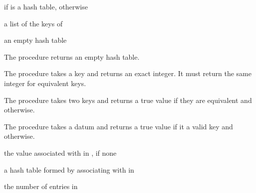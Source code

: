 \begin{procedure}
\end{procedure}
\returns{}  if  is a hash table, 
otherwise

\begin{procedure}
\end{procedure}
\returns{} a list of the keys of 

\begin{procedure}
\end{procedure}
\returns{} an empty hash table

The  procedure returns an empty hash table.

The  procedure takes a key and returns an exact
integer. It must return the same integer for equivalent keys.

The  procedure takes two keys and returns a true value
if they are equivalent and  otherwise.

The  procedure takes a datum and returns a true value
if it a valid key and  otherwise.

\begin{procedure}
\end{procedure}
\returns{} the value associated with  in ,
 if none

\begin{procedure}
\end{procedure}
\returns{} a hash table formed by associating  with 
in 

\begin{procedure}
\end{procedure}
\returns{} the number of entries in 

